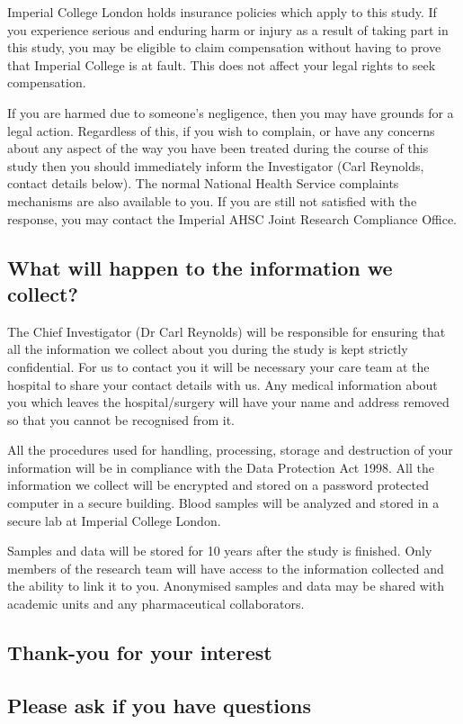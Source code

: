 \documentclass[a4paper,10pt]{article}
\begin{document}
Imperial College London holds insurance policies which apply to this study. If you experience serious and enduring harm or injury as a result of taking part in this study, you may be eligible to claim compensation without having to prove that Imperial College is at fault. This does not affect your legal rights to seek compensation.

If you are harmed due to someone’s negligence, then you may have grounds for a legal action. Regardless of this, if you wish to complain, or have any concerns about any aspect of the way you have been treated during the course of this study then you should immediately inform the Investigator (Carl Reynolds, contact details below). The normal National Health Service complaints mechanisms are also available to you. If you are still not satisfied with the response, you may contact the
Imperial AHSC Joint Research Compliance Office. 


\subsection*{What will happen to the information we collect?}

The Chief Investigator (Dr Carl Reynolds) will be responsible for ensuring that all the information we collect about you during the study is kept strictly confidential. For us to contact you it will be necessary your care team at the hospital to share your contact details with us. 
Any medical information about you which leaves the hospital/surgery will have your name and address removed so that you cannot be recognised from it. 

All the procedures used for handling, processing, storage and destruction of your information will be in compliance with the Data Protection Act 1998. All the information we collect will be encrypted and stored on a password protected computer in a secure building. Blood samples will be analyzed and stored in a secure lab at Imperial College London. 

Samples and data will be stored for 10 years after the study is finished. Only members of the research team will have access to the information collected and the ability to link it to you. Anonymised samples and data may be shared with academic units and any pharmaceutical collaborators.

\begin{centering}
\subsection*{Thank-you for your interest}
\subsection*{Please ask if you have questions}
\end{centering}
\end{document}
